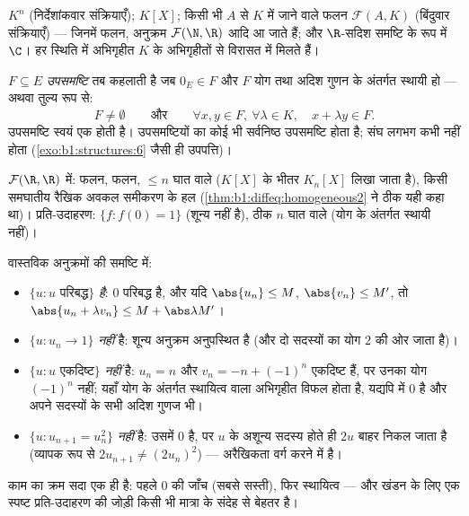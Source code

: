 \begin{example}\label{ex:b1:vspaces:examples}
$K^n$ (निर्देशांकवार संक्रियाएँ);  $K[X]$; किसी भी  $A$ से $K$
में जाने वाले फलन $\mathcal{F}(A, K)$ (बिंदुवार संक्रियाएँ) --- जिनमें 
फलन, अनुक्रम $\mathcal{F}(\N, \R)$ आदि आ जाते हैं; और $\R$-सदिश समष्टि के
रूप में $\C$। हर स्थिति में अभिगृहीत $K$ के अभिगृहीतों से विरासत में मिलते
हैं।
\end{example}

\begin{definition}[उपसमष्टि]\label{def:b1:vspaces:subspace}
$F \subseteq E$ \emph{उपसमष्टि} तब कहलाती है जब $0_E \in F$
और $F$ योग तथा अदिश गुणन के अंतर्गत स्थायी हो --- अथवा तुल्य रूप से:
\[
F \neq \emptyset
\qquad\text{और}\qquad
\forall x, y \in F,\ \forall \lambda \in K,\quad
x + \lambda y \in F .
\]
उपसमष्टि स्वयं एक  होती है। उपसमष्टियों का कोई भी सर्वनिष्ठ
उपसमष्टि होता है; संघ लगभग कभी नहीं होता (\cref{exo:b1:structures:6} जैसी ही
उपपत्ति)।
\end{definition}

\begin{example}\label{ex:b1:vspaces:subspaces}
$\mathcal{F}(\R, \R)$ में:  फलन,  फलन, $\leq n$ घात वाले 
($K[X]$ के भीतर $K_n[X]$ लिखा जाता है), किसी समघातीय रैखिक अवकल समीकरण के हल
(\cref{thm:b1:diffeq:homogeneous2} ने ठीक यही कहा था)। प्रति-उदाहरण: $\{f :
f(0) = 1\}$ (शून्य नहीं है), ठीक $n$ घात वाले  (योग के अंतर्गत स्थायी
नहीं)।
\end{example}

\begin{example}[उपसमष्टि है या नहीं: चार निर्णय, तर्क सहित]
\label{ex:b1:vspaces:subspaceornot}
वास्तविक अनुक्रमों की समष्टि में:
\begin{itemize}
  \item $\{u : u \text{ परिबद्ध}\}$  \emph{है}: $0$ परिबद्ध है, और
  यदि $\abs{u_n} \leq M$, $\abs{v_n} \leq M'$, तो $\abs{u_n + \lambda v_n}
  \leq M + \abs\lambda M'$।
  \item $\{u : u_n \to 1\}$ \emph{नहीं} है: शून्य अनुक्रम अनुपस्थित है (और
  दो सदस्यों का योग $2$ की ओर जाता है)।
  \item $\{u : u \text{ एकदिष्ट}\}$ \emph{नहीं} है: $u_n = n$ और $v_n = -n +
  (-1)^n$ एकदिष्ट हैं, पर उनका योग $(-1)^n$ नहीं; यहाँ योग के अंतर्गत
  स्थायित्व वाला अभिगृहीत विफल होता है, यद्यपि  में $0$ है और अपने
  सदस्यों के सभी अदिश गुणज भी।
  \item $\{u : u_{n+1} = u_n^2\}$ \emph{नहीं} है: उसमें $0$ है, पर $u$ के
  अशून्य सदस्य होते ही $2u$ बाहर निकल जाता है (व्यापक रूप से $2u_{n+1} \neq
  (2u_n)^2$) --- अरैखिकता वर्ग करने में है।
\end{itemize}
काम का क्रम सदा एक ही है: पहले $0$ की जाँच (सबसे सस्ती), फिर स्थायित्व ---
और खंडन के लिए एक स्पष्ट प्रति-उदाहरण की जोड़ी किसी भी मात्रा के संदेह से
बेहतर है।
\end{example}

